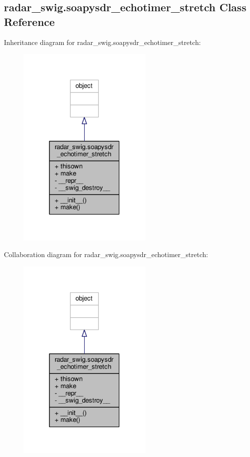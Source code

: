 \subsection{radar\+\_\+swig.\+soapysdr\+\_\+echotimer\+\_\+stretch Class Reference}
\label{classradar__swig_1_1soapysdr__echotimer__stretch}


Inheritance diagram for radar\+\_\+swig.\+soapysdr\+\_\+echotimer\+\_\+stretch\+:
\nopagebreak
\begin{figure}[H]
\begin{center}
\leavevmode
\includegraphics[width=187pt]{d9/d8e/classradar__swig_1_1soapysdr__echotimer__stretch__inherit__graph}
\end{center}
\end{figure}


Collaboration diagram for radar\+\_\+swig.\+soapysdr\+\_\+echotimer\+\_\+stretch\+:
\nopagebreak
\begin{figure}[H]
\begin{center}
\leavevmode
\includegraphics[width=187pt]{d3/df7/classradar__swig_1_1soapysdr__echotimer__stretch__coll__graph}
\end{center}
\end{figure}
